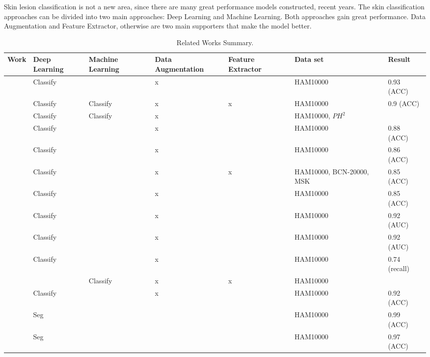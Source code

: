 \documentclass[sensors,article,submit,pdftex,moreauthors]{Definitions/mdpi}
\begin{document}
	{Skin lesion classification is not a new area, since there are many great performance models constructed, recent years. The skin classification approaches can be divided into two main approaches: Deep Learning and Machine Learning. Both approaches gain great performance. Data Augmentation and Feature Extractor, otherwise are two main supporters that make the model better.
		\begin{table}[H]
			\centering
			\begin{tabular}{| c | p{1.5cm} | p{1.5cm} | p{2cm} | p{1.5cm} | p{2cm} | p{1cm} |}
				\hline
				Work & Deep Learning & Machine Learning & Data 
				Augmentation & Feature Extractor & Data set & Result\\
				\hline
				\cite{03358} & Classify & & x & & HAM10000 & 0.93 (ACC)\\
				\hline
				\cite{03798} & Classify & Classify & x & x & HAM10000 & 0.9 (ACC)\\
				\hline
				\cite{10348} & Classify & Classify & x & & HAM10000, $PH^2$ & \\
				\hline
				\cite{09418} & Classify & & x & & HAM10000 & 0.88 (ACC)\\
				\hline
				\cite{01284} & Classify & & x & & HAM10000 & 0.86 (ACC)\\
				\hline
				\cite{06612} & Classify & & x & x & HAM10000, BCN-20000, MSK & 0.85 (ACC)\\
				\hline
				\cite{03225} & Classify & & x & & HAM10000 & 0.85 (ACC)\\
				\hline
				\cite{12602} & Classify & & x & & HAM10000 & 0.92 (AUC)\\
				\hline
				\cite{03426} & Classify & & x & & HAM10000 & 0.92 (AUC)\\
				\hline
				\cite{03910} & Classify & & x & & HAM10000 & 0.74 (recall)\\
				\hline
				\cite{05045} & & Classify & x & x & HAM10000 & \\
				\hline
				\cite{2101.133} & Classify&  & x &  & HAM10000 & 0.92 (ACC)\\
				\hline
				\cite{22750} & Seg&  &  &  & HAM10000 & 0.99 (ACC)\\
				\hline
				\cite{9445180} & Seg &  &  &  & HAM10000 & 0.97 (ACC)\\
				\hline
			\end{tabular}
			\caption{Related Works Summary.}
			\label{table:related-work-summary}
		\end{table}
}
\end{document}
